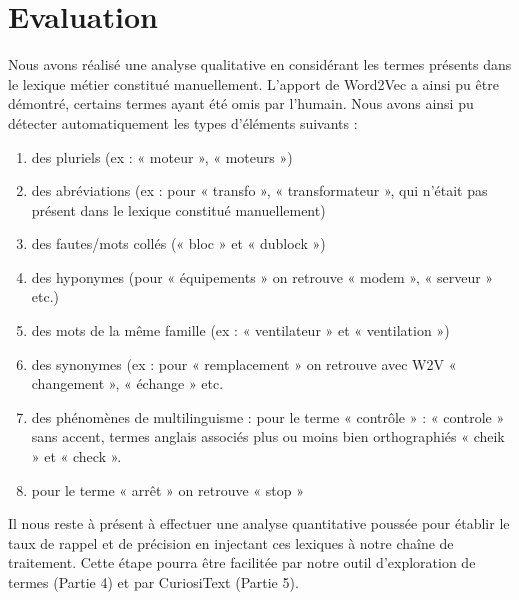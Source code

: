 \section{Evaluation}
Nous avons réalisé une analyse qualitative en considérant les termes présents dans le lexique métier constitué manuellement. L'apport de Word2Vec a ainsi pu être démontré, certains termes ayant été omis par l'humain. Nous avons ainsi pu détecter automatiquement les types d’éléments suivants :

\begin{enumerate}
\item des pluriels (ex : « moteur », « moteurs »)
\item 	des abréviations (ex : pour « transfo », « transformateur », qui n’était pas présent dans le lexique constitué manuellement)
\item 	des fautes/mots collés (« bloc » et « dublock »)
\item 	des hyponymes (pour « équipements » on retrouve « modem », « serveur » etc.)
\item 	des mots de la même famille (ex : « ventilateur » et « ventilation »)
\item 	des synonymes (ex : pour « remplacement » on retrouve avec W2V « changement », « échange » etc.
\item 	des phénomènes de multilinguisme : pour le terme « contrôle » : « controle » sans accent, termes anglais associés plus ou moins bien orthographiés « cheik » et « check ».
\item 	pour le terme « arrêt » on retrouve « stop »

\end{enumerate}

Il nous reste à présent à effectuer une analyse quantitative poussée pour établir le taux de rappel et de précision en injectant ces lexiques à notre chaîne de traitement. Cette étape pourra être facilitée par notre outil d’exploration de termes (Partie 4) et par CuriosiText (Partie 5).
